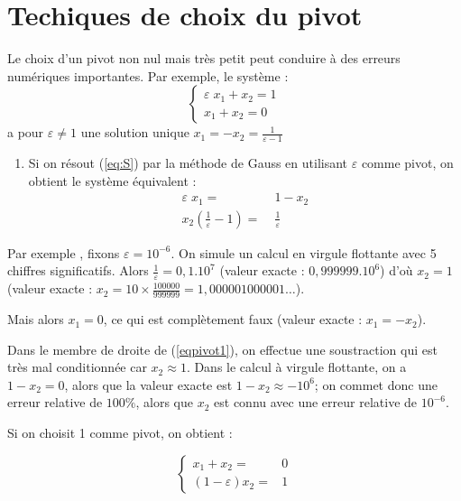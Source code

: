 \documentclass[a4paper,11pt]{article}
\theoremstyle{plain} %
\begin{document}
\section{Techiques de choix du pivot}

Le choix d'un pivot non nul mais très petit peut conduire à des erreurs numériques importantes.
Par exemple, le système :
\begin{equation*}
    \left\lbrace
    \begin{array}{c}
        \varepsilon \; x_1 + x_2 = 1 \\
        x_1 + x_2 = 0 
    \end{array} \right.
\end{equation*}
a pour $\varepsilon \ne 1$ une solution unique $x_1 = -x_2 = \displaystyle\frac{1}{\varepsilon - 1}$

\begin{enumerate}[-]
    \item Si on résout (\ref{eq:S}) par la méthode de Gauss en utilisant $\varepsilon$ comme
        pivot, on obtient le système équivalent :
            \begin{align}
                \label{eqpivot1}
                \varepsilon \; x_1 = \; & 1 - x_2  \\
                x_2 (\frac{1}{\varepsilon} - 1) = \; & \frac{1}{\varepsilon} 
                \label{eqpivot2}
            \end{align}
\end{enumerate}

Par exemple , fixons $\varepsilon = 10^{-6}$. On simule un calcul
en virgule flottante avec 5 chiffres significatifs. Alors
$\frac{1}{\varepsilon} = 0,1.10^{7}$ (valeur exacte : $0,999999.10^6$)
d'où $x_2 = 1$ (valeur exacte : $x_2 = 10 \times \frac{100000}{999999} = 1,000001000001\dots$).

Mais alors $x_1 = 0$, ce qui est complètement faux (valeur exacte :
$x_1 = -x_2$).

Dans le membre de droite de (\ref{eqpivot1}), on effectue une 
soustraction qui est très mal conditionnée car $x_2 \approx 1$. Dans le calcul à
virgule flottante, on a $1 - x_2 = 0$, alors que la valeur exacte est 
$1 - x_2 \approx - 10^6$; on commet donc une erreur relative de $100 \%$,
alors que $x_2$ est connu avec une erreur relative de $10^{-6}$.

Si on choisit 1 comme pivot, on obtient :

\begin{equation*}
     \left \lbrace
     \begin{array}{ccc}
         x_1 + x_2  = & 0 \\[7pt]
         (1 - \varepsilon) x_2  = & 1
     \end{array}
     \right.
\end{equation*}
\end{document}
